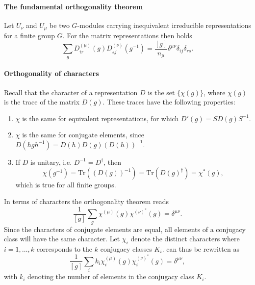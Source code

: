 \documentclass[../../main.tex]{subfiles}
\begin{document}
\paragraph{The fundamental orthogonality theorem}
Let $U_\nu$ and $U_\mu$ be two $G$-modules carrying inequivalent irreducible representations for a finite group $G$. For the matrix representations then holds
\begin{equation}
    \sum_g D^{(\mu)}_{ir} (g) D^{(\nu)}_{sj} (g^{-1}) = \frac{[g]}{n_\mu} \delta^{\mu \nu} \delta_{ij} \delta_{rs} .
\end{equation}

\paragraph{Orthogonality of characters}
Recall that the character of a representation $D$ is the set $\{\chi(g)\}$, where $\chi(g)$ is the trace of the matrix $D(g)$. These traces have the following properties:
\begin{enumerate}
    \item $\chi$ is the same for equivalent representations, for which $D'(g) = SD(g)S^{-1}$.
    \item $\chi$ is the same for conjugate elements, since $D(hgh^{-1}) = D(h)D(g)(D(h))^{-1}$.
    \item If $D$ is unitary, i.e. $D^{-1} = D^\dagger$, then
    \begin{equation}
        \chi(g^{-1}) = \text{Tr}((D(g))^{-1}) = \text{Tr}(D(g)^\dagger) = \chi^*(g),
    \end{equation}
    which is true for all finite groups.
\end{enumerate}

In terms of characters the orthogonality theorem reads
\begin{equation}
    \frac{1}{[g]} \sum_g \chi^{(\mu)}(g) \chi^{(\nu)^*}(g) = \delta^{\mu \nu}. \label{eq:gt_character_orthogonality}
\end{equation}
Since the characters of conjugate elements are equal, all elements of a conjugacy class will have the same character. Let $\chi_i$ denote the distinct characters where $i=1,\dots,k$ corresponds to the $k$ conjugacy classes $K_i$.  can thus be rewritten as
\begin{equation}
    \frac{1}{[g]} \sum_i k_i \chi_i^{(\mu)}(g) \chi_i^{(\nu)^*}(g) = \delta^{\mu \nu} ,
\end{equation}
with $k_i$ denoting the number of elements in the conjugacy class $K_i$. 
\end{document}
